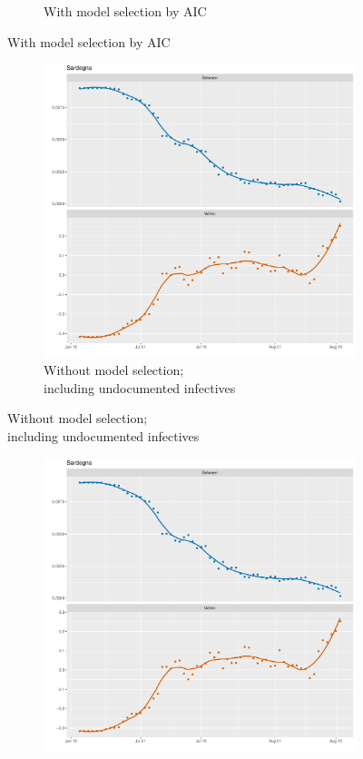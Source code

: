 \documentclass[12pt]{article}
\begin{document}
\begin{appendices}
\begin{figure}[H]
\begin{subfigure}{\textwidth}
    	      \caption{With model selection by AIC}
    	      \label{fig:beta_between_over_time_isole_aic}
    	    \end{subfigure}
    	\end{figure}
        \begin{figure}[H]\ContinuedFloat
    	    \begin{subfigure}{\textwidth}
    	      \centering
    	      \includegraphics[width=0.8\linewidth]{output/model_between_lag14_betas_Isole_UndocQuadratic_rolling.pdf}
    	      \caption{Without model selection; \\ including undocumented infectives}
    	      \label{fig:beta_between_over_time_isole_regular_undoc}
    	    \end{subfigure}
        \end{figure}
        \begin{figure}[H]\ContinuedFloat
    	    \begin{subfigure}{\textwidth}
    	      \centering
    	      \includegraphics[width=0.8\linewidth]{output/model_between_lag14_betas_Isole_aic_UndocQuadratic_rolling.pdf}

\end{subfigure}
\end{figure}
\end{appendices}
\end{document}
